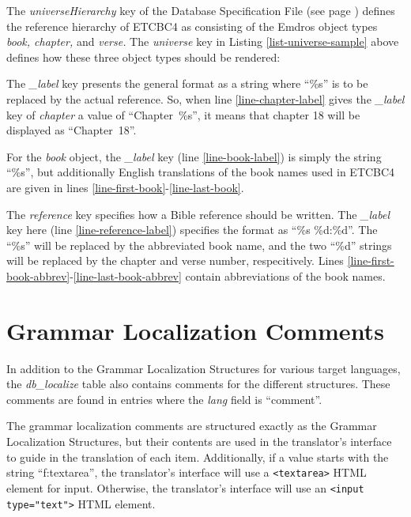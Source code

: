\documentclass[11pt,oneside,a4paper]{memoir}
\newcommand*{\xml}[1]{\texttt{<#1>}}
\begin{document}
The \emph{universeHierarchy} key of the Database Specification File (see page
\pageref{universe-hierarchy}) defines the reference hierarchy of ETCBC4 as consisting of the Emdros
object types \emph{book, chapter,} and \emph{verse.} The \emph{universe} key in Listing
\ref{list-universe-sample} above defines how these three object types should be rendered:

The \emph{\_label} key presents the general format as a string where ``\%s'' is to be replaced by
the actual reference. So, when line \ref{line-chapter-label} gives the \emph{\_label} key of
\emph{chapter} a value of ``Chapter~\%s'', it means that chapter 18 will be displayed as
``Chapter~18''.

For the \emph{book} object, the \emph{\_label} key (line \ref{line-book-label}) is simply the string
``\%s'', but additionally English translations of the book names used in ETCBC4 are given in lines
\ref{line-first-book}-\ref{line-last-book}.

The \emph{reference} key specifies how a Bible reference should be written. The \emph{\_label} key
here (line \ref{line-reference-label}) specifies the format as ``\%s \%d:\%d''. The ``\%s'' will be
replaced by the abbreviated book name, and the two ``\%d'' strings will be replaced by the chapter
and verse number, respecitively. Lines \ref{line-first-book-abbrev}-\ref{line-last-book-abbrev}
contain abbreviations of the book names.


\section{Grammar Localization Comments}\label{sec-gram-loc-comments}

In addition to the Grammar Localization Structures for various target languages, the
\emph{db\_localize} table also contains comments for the different structures. These comments are
found in entries where the \emph{lang} field is ``comment''.

The grammar localization comments are structured exactly as the Grammar Localization Structures, but
their contents are used in the translator's interface to guide in the translation of each item.
Additionally, if a value starts with the string ``f:textarea'', the translator's interface will use
a \xml{textarea} HTML element for input. Otherwise, the translator's interface will use an
\xml{input type="text"} HTML element.
\end{document}
